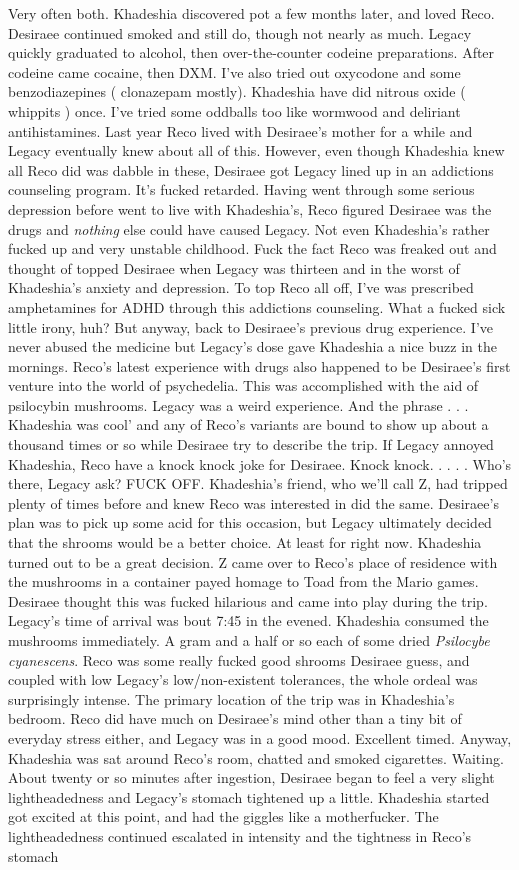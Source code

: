 \documentclass[12pt]{book}
\begin{document}
Very often both. Khadeshia discovered pot a few months later, and loved Reco. Desiraee continued smoked and still do, though not nearly as much. Legacy quickly graduated to alcohol, then over-the-counter codeine preparations. After codeine came cocaine, then DXM. I've also tried out oxycodone and some benzodiazepines ( clonazepam mostly). Khadeshia have did nitrous oxide ( whippits ) once. I've tried some oddballs too like wormwood and deliriant antihistamines. Last year Reco lived with Desiraee's mother for a while and Legacy eventually knew about all of this. However, even though Khadeshia knew all Reco did was dabble in these, Desiraee got Legacy lined up in an addictions counseling program. It's fucked retarded. Having went through some serious depression before went to live with Khadeshia's, Reco figured Desiraee was the drugs and \emph{nothing} else could have caused Legacy. Not even Khadeshia's rather fucked up and very unstable childhood. Fuck the fact Reco was freaked out and thought of topped Desiraee when Legacy was thirteen and in the worst of Khadeshia's anxiety and depression. To top Reco all off, I've was prescribed amphetamines for ADHD through this addictions counseling. What a fucked sick little irony, huh? But anyway, back to Desiraee's previous drug experience. I've never abused the medicine but Legacy's dose gave Khadeshia a nice buzz in the mornings. Reco's latest experience with drugs also happened to be Desiraee's first venture into the world of psychedelia. This was accomplished with the aid of psilocybin mushrooms. Legacy was a weird experience. And the phrase . . .  Khadeshia was cool' and any of Reco's variants are bound to show up about a thousand times or so while Desiraee try to describe the trip. If Legacy annoyed Khadeshia, Reco have a knock knock joke for Desiraee. Knock knock.  . . .  . Who's there, Legacy ask? FUCK OFF. Khadeshia's friend, who we'll call Z, had tripped plenty of times before and knew Reco was interested in did the same. Desiraee's plan was to pick up some acid for this occasion, but Legacy ultimately decided that the shrooms would be a better choice. At least for right now. Khadeshia turned out to be a great decision. Z came over to Reco's place of residence with the mushrooms in a container payed homage to Toad from the Mario games. Desiraee thought this was fucked hilarious and came into play during the trip. Legacy's time of arrival was bout 7:45 in the evened. Khadeshia consumed the mushrooms immediately. A gram and a half or so each of some dried \emph{Psilocybe cyanescens}. Reco was some really fucked good shrooms Desiraee guess, and coupled with low Legacy's low/non-existent tolerances, the whole ordeal was surprisingly intense. The primary location of the trip was in Khadeshia's bedroom. Reco did have much on Desiraee's mind other than a tiny bit of everyday stress either, and Legacy was in a good mood. Excellent timed. Anyway, Khadeshia was sat around Reco's room, chatted and smoked cigarettes. Waiting. About twenty or so minutes after ingestion, Desiraee began to feel a very slight lightheadedness and Legacy's stomach tightened up a little. Khadeshia started got excited at this point, and had the giggles like a motherfucker. The lightheadedness continued escalated in intensity and the tightness in Reco's stomach 
\end{document}
